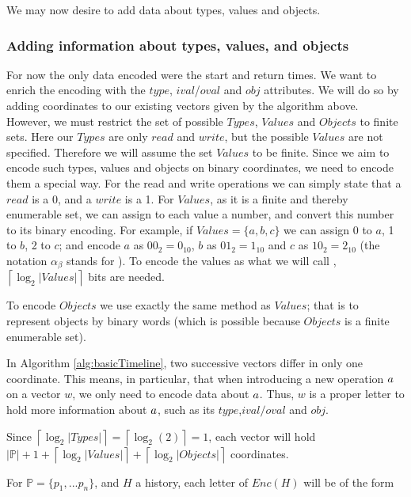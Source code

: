 \documentclass[12pt]{article}
\begin{document}
We may now desire to add data about types, values and objects.

\vspace{1em}

\subsubsection{Adding information about types, values, and objects}

For now the only data encoded were the start and return times. We want to enrich the encoding with the $type$, $ival$/$oval$ and $obj$ attributes. We will do so by adding coordinates to our existing vectors given by the algorithm above. However, we must restrict the set of possible $Types$, $Values$ and $Objects$ to finite sets. Here our $Types$ are only $read$ and $write$, but the possible $Values$ are not specified. Therefore we will assume the set $Values$ to be finite. Since we aim to encode such types, values and objects on binary coordinates, we need to encode them a special way. For the read and write operations we can simply state that a $read$ is a 0, and a $write$ is a 1. For $Values$, as it is a finite and thereby enumerable set, we can assign to each value a number, and convert this number to its binary encoding. For example, if $Values=\{a,b,c\}$ we can assign 0 to $a$, 1 to $b$, 2 to $c$; and encode $a$ as $00_2=0_{10}$, $b$ as $01_2=1_{10}$ and $c$ as $10_2=2_{10}$ (the notation $\alpha_\beta$ stands for ). To encode the values as what we will call , $\left\lceil \log_2 |Values| \right\rceil$ bits are needed.

To encode $Objects$ we use exactly the same method as $Values$; that is to represent objects by binary words (which is possible because $Objects$ is a finite enumerable set).

In Algorithm \autoref{alg:basicTimeline}, two successive vectors differ in only one coordinate. This means, in particular, that when introducing a new operation $a$ on a vector $w$, we only need to encode data about $a$. Thus, $w$ is a proper letter to hold more information about $a$, such as its $type$,$ival/oval$ and $obj$.

Since $\left\lceil \log_2 |Types| \right\rceil=\left\lceil \log_2 (2) \right\rceil=1$, each vector will hold $|\mathbb{P}|+1 + \left\lceil \log_2 |Values| \right\rceil + \left\lceil \log_2 |Objects| \right\rceil$ coordinates.

For $\mathbb{P}=\{p_1,...p_n\}$, and $H$ a history, each letter of $Enc(H)$ will be of the form
\end{document}
